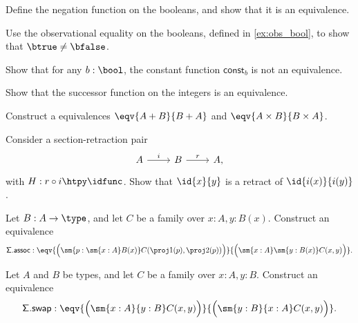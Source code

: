 \begin{exercises}
\begin{subexenum}
\item Define the negation function on the booleans, and show that it is an equivalence.
\item Use the observational equality on the booleans, defined in \cref{ex:obs_bool}, to show that $\btrue\neq\bfalse$.
\item Show that for any $b:\bool$, the constant function $\mathsf{const}_b$ is not an equivalence.
\end{subexenum}
\item \label{ex:succ_equiv} Show that the successor function on the integers is an equivalence.
\item \label{ex:comm_prod}Construct a equivalences $\eqv{A+B}{B+A}$ and $\eqv{A\times B}{B\times A}$.
\item \label{ex:retr_id} Consider a section-retraction pair
\begin{equation*}
\begin{tikzcd}
A \arrow[r,"i"] & B \arrow[r,"r"] & A,
\end{tikzcd}
\end{equation*}
with $H:r\circ i\htpy \idfunc$. Show that $\id{x}{y}$ is a retract of $\id{i(x)}{i(y)}$.
\item \label{ex:sigma_assoc}Let $B:A\to \type$, and let $C$ be a family over $x:A,y:B(x)$. Construct an equivalence
\begin{equation*}
\mathsf{\Sigma.assoc}:\eqv{\Big(\sm{p:\sm{x:A}B(x)}C(\proj 1(p),\proj 2(p))\Big)}{\Big(\sm{x:A}\sm{y:B(x)}C(x,y)\Big)}.
\end{equation*}
\item \label{ex:sigma_swap}Let $A$ and $B$ be types, and let $C$ be a family over $x:A,y:B$. Construct an equivalence
\begin{equation*}
\mathsf{\Sigma.swap}:\eqv{\Big(\sm{x:A}{y:B}C(x,y)\Big)}{\Big(\sm{y:B}{x:A}C(x,y)\Big)}.
\end{equation*}

\end{exercises}
